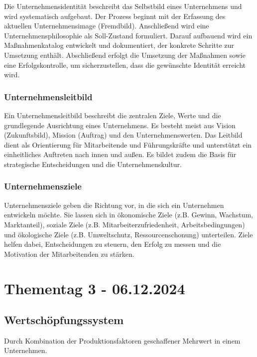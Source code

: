 \documentclass[]{article}
\begin{document}
Die Unternehmensidentität beschreibt das Selbstbild eines Unternehmens und wird systematisch aufgebaut. Der Prozess beginnt mit der Erfassung des aktuellen Unternehmensimage (Fremdbild). Anschließend wird eine Unternehmensphilosophie als Soll-Zustand formuliert. Darauf aufbauend wird ein Maßnahmenkatalog entwickelt und dokumentiert, der konkrete Schritte zur Umsetzung enthält. Abschließend erfolgt die Umsetzung der Maßnahmen sowie eine Erfolgskontrolle, um sicherzustellen, dass die gewünschte Identität erreicht wird.

\subsubsection{Unternehmensleitbild}

Ein Unternehmensleitbild beschreibt die zentralen Ziele, Werte und die grundlegende Ausrichtung eines Unternehmens. Es besteht meist aus Vision (Zukunftsbild), Mission (Auftrag) und den Unternehmenswerten. Das Leitbild dient als Orientierung für Mitarbeitende und Führungskräfte und unterstützt ein einheitliches Auftreten nach innen und außen. Es bildet zudem die Basis für strategische Entscheidungen und die Unternehmenskultur.

\subsubsection{Unternehmensziele}

Unternehmensziele geben die Richtung vor, in die sich ein Unternehmen entwickeln möchte. Sie lassen sich in ökonomische Ziele (z.B. Gewinn, Wachstum, Marktanteil), soziale Ziele (z.B. Mitarbeiterzufriedenheit, Arbeitsbedingungen) und ökologische Ziele (z.B. Umweltschutz, Ressourcenschonung) unterteilen. Ziele helfen dabei, Entscheidungen zu steuern, den Erfolg zu messen und die Motivation der Mitarbeitenden zu stärken. 

\newpage
\section{Thementag 3 - 06.12.2024}

\subsection{Wertschöpfungssystem}

Durch Kombination der Produktionsfaktoren geschaffener Mehrwert in einem Unternehmen. \\
\end{document}
